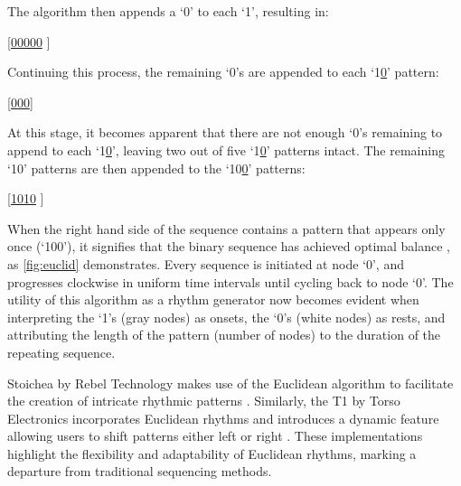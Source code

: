 \documentclass[12pt]{article}
\numberwithin{subsubsubsection}{subsubsection}
\begin{document}
The algorithm then appends a `0’ to each `1’, resulting in:

\begin{center}
[\underline{0}\underline{0}\underline{0}\underline{0}\underline{0}\textbar\: \textbar]
\end{center}

Continuing this process, the remaining `0’s are appended to each `1\underline{0}’ pattern:

\begin{center}
[\underline{0}\underline{0}\underline{0}\textbar\:\;\textbar]
\end{center}

At this stage, it becomes apparent that there are not enough `0’s remaining to append to each `1\underline{0}’, leaving two out of five `1\underline{0}’ patterns intact. The remaining ‘10’ patterns are then appended to the `10\underline{0}’ patterns:

\begin{center}
[\underline{10}\underline{10}\textbar\: \textbar]
\end{center}

When the right hand side of the sequence contains a pattern that appears only once (`100'), it signifies that the binary sequence has achieved optimal balance \cite{Toussaint2}, as \autoref{fig:euclid} demonstrates. Every sequence is initiated at node `0', and progresses clockwise in uniform time intervals until cycling back to node `0'. The utility of this algorithm as a rhythm generator now becomes evident when interpreting the `1's (gray nodes) as onsets, the `0's (white nodes) as rests, and attributing the length of the pattern (number of nodes) to the duration of the repeating sequence.

Stoichea by Rebel Technology makes use of the Euclidean algorithm to facilitate the creation of intricate rhythmic patterns \cite{Stoicha}. Similarly, the T1 by Torso Electronics incorporates Euclidean rhythms and introduces a dynamic feature allowing users to shift patterns either left or right \cite{Torso}. These implementations highlight the flexibility and adaptability of Euclidean rhythms, marking a departure from traditional sequencing methods. 
\end{document}
